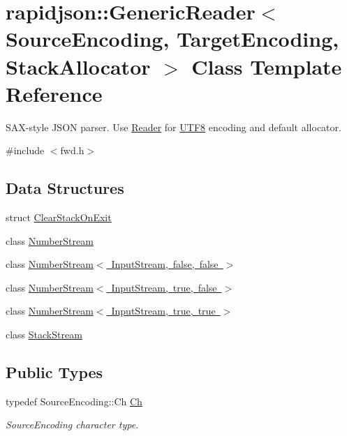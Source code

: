 \hypertarget{classrapidjson_1_1_generic_reader}{}\section{rapidjson\+::Generic\+Reader$<$ Source\+Encoding, Target\+Encoding, Stack\+Allocator $>$ Class Template Reference}
\label{classrapidjson_1_1_generic_reader}


S\+A\+X-\/style J\+S\+ON parser. Use \mbox{\hyperlink{namespacerapidjson_ad5310edd1226f5b3ea82dc0d4d3740c6}{Reader}} for \mbox{\hyperlink{structrapidjson_1_1_u_t_f8}{U\+T\+F8}} encoding and default allocator.  




{\ttfamily \#include $<$fwd.\+h$>$}

\subsection*{Data Structures}
\begin{DoxyCompactItemize}
\item 
struct \mbox{\hyperlink{structrapidjson_1_1_generic_reader_1_1_clear_stack_on_exit}{Clear\+Stack\+On\+Exit}}
\item 
class \mbox{\hyperlink{classrapidjson_1_1_generic_reader_1_1_number_stream}{Number\+Stream}}
\item 
class \mbox{\hyperlink{classrapidjson_1_1_generic_reader_1_1_number_stream_3_01_input_stream_00_01false_00_01false_01_4}{Number\+Stream$<$ Input\+Stream, false, false $>$}}
\item 
class \mbox{\hyperlink{classrapidjson_1_1_generic_reader_1_1_number_stream_3_01_input_stream_00_01true_00_01false_01_4}{Number\+Stream$<$ Input\+Stream, true, false $>$}}
\item 
class \mbox{\hyperlink{classrapidjson_1_1_generic_reader_1_1_number_stream_3_01_input_stream_00_01true_00_01true_01_4}{Number\+Stream$<$ Input\+Stream, true, true $>$}}
\item 
class \mbox{\hyperlink{classrapidjson_1_1_generic_reader_1_1_stack_stream}{Stack\+Stream}}
\end{DoxyCompactItemize}
\subsection*{Public Types}
\begin{DoxyCompactItemize}
\item 
typedef Source\+Encoding\+::\+Ch \mbox{\hyperlink{classrapidjson_1_1_generic_reader_a0781d19e8c6bc044d9cc5f5d3dde287e}{Ch}}
\begin{DoxyCompactList}\small\item\em Source\+Encoding character type. \end{DoxyCompactList}\end{DoxyCompactItemize}
